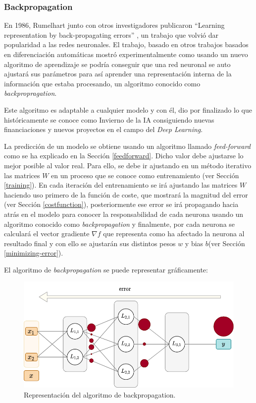 \subsubsection{Backpropagation}\label{backpropagation}

En 1986, Rumelhart junto con otros investigadores publicaron “Learning representation by back-propagating errors” \cite{rumelhart}, un trabajo que volvió dar popularidad a las redes neuronales. El trabajo, basado en otros trabajos basados en diferenciación automáticas mostró experimentalmente como usando un nuevo algoritmo de aprendizaje se podría conseguir que una red neuronal se auto ajustará sus parámetros para así aprender una representación interna de la información que estaba procesando, un algoritmo conocido como \textit{backpropragation}.
\newline

Este algoritmo es adaptable a cualquier modelo y con él, dio por finalizado lo que históricamente se conoce como Invierno de la IA consiguiendo nuevas financiaciones y nuevos proyectos en el campo del \textit{Deep Learning}.
\newline

La predicción de un modelo se obtiene usando un algoritmo llamado \textit{feed-forward} como se ha explicado en la Sección \ref{feedforward}. Dicho valor debe ajustarse lo mejor posible al valor real. Para ello, se debe ir ajustando en un método iterativo las matrices $W$ en un proceso que se conoce como entrenamiento (ver Sección \ref{training}). En cada iteración del entrenamiento se irá ajustando las matrices $W$ haciendo uso primero de la función de coste, que mostrará la magnitud del error (ver Sección \ref{costfunction}), posteriormente ese error se irá propagando hacia atrás en el modelo para conocer la responsabilidad de cada neurona usando un algoritmo conocido como \textit{backpropagation} y finalmente, por cada neurona se calculará el vector gradiente $\nabla f$ que representa como ha afectado la neurona al resultado final y con ello se ajustarán sus distintos pesos $w$ y bias $b$(ver Sección \ref{minimizing-error}). 
\newline

El algoritmo de \textit{backpropagation} se puede representar gráficamente:

\begin{figure}[H]
    \centering
    \includegraphics[width=14cm]{images/state-of-art/back-propagation/network_descent_gradient.png}
    \caption{Representación del algoritmo de backpropagation.}
    \label{fig:basic_network}
\end{figure}

